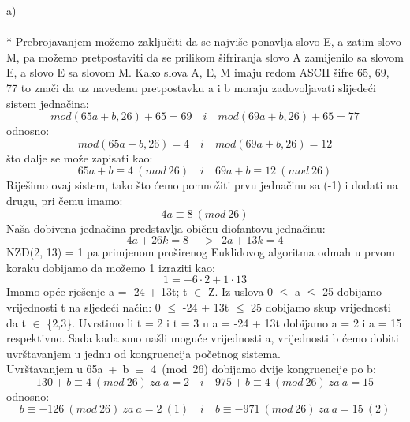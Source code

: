 \documentclass[12pt]{article}
\begin{document}
\begin{enumerate}
a) \\
\\
* Prebrojavanjem možemo zaključiti da se najviše ponavlja slovo E, a zatim
slovo M, pa možemo pretpostaviti da se prilikom šifriranja slovo A zamijenilo sa slovom E,
a slovo E sa slovom M. Kako slova A, E, M imaju
redom ASCII šifre 65, 69, 77 to znači da uz navedenu pretpostavku
a i b moraju zadovoljavati slijedeći sistem jednačina:
\begin{equation*}
mod(65a + b, 26) + 65 = 69 \quad i \quad mod(69a + b, 26) + 65 = 77
\end{equation*}
odnosno: 
\begin{equation*}
mod(65a + b, 26) = 4 \quad i \quad mod(69a + b, 26) = 12
\end{equation*}
što dalje se može zapisati kao:
\begin{equation*}
65a + b \equiv 4~(mod~26) \quad i \quad 69a + b \equiv 12~(mod~26) 
\end{equation*}
Riješimo ovaj sistem, tako što ćemo pomnožiti prvu jednačinu sa (-1) i dodati na drugu, pri čemu imamo:
\begin{equation*}
4a \equiv 8~(mod~26)
\end{equation*}
Naša dobivena jednačina predstavlja običnu diofantovu jednačinu:
\begin{equation*}
4a + 26k = 8 ~~ -> ~~ 2a + 13k = 4
\end{equation*}
NZD(2, 13) = 1 pa primjenom proširenog Euklidovog algoritma odmah
u prvom koraku dobijamo da možemo 1 izraziti kao:
\begin{equation*}
1 = -6 \cdot 2 + 1 \cdot 13
\end{equation*}
Imamo opće rješenje a = -24 + 13t; t ${\in}$ Z. Iz uslova 0 ${\leq}$ a ${\leq}$ 25
dobijamo vrijednosti t na sljedeći način: 0 ${\leq}$ -24 + 13t ${\leq}$ 25 dobijamo skup vrijednosti da t ${\in}$ \{2,3\}.
Uvrstimo li t = 2 i t = 3 u a = -24 + 13t dobijamo a = 2 i a = 15
respektivno. Sada kada smo našli moguće vrijednosti a, vrijednosti b
ćemo dobiti uvrštavanjem u jednu od kongruencija početnog sistema.
\\
Uvrštavanjem u 65a~+~b ${\equiv}$ 4~(mod~26) dobijamo dvije kongruencije po
b:
\begin{equation*}
130 + b \equiv 4~(mod~26)~ za~a = 2 \quad i \quad 975 + b \equiv 4~(mod~26)~za~a = 15
\end{equation*}
odnosno: 
\begin{equation*}
b \equiv -126~(mod~26)~ za~a = 2~(1) \quad i \quad  b \equiv -971~(mod~26)~za~a = 15~(2)
\end{equation*}

\end{enumerate}
\end{document}
